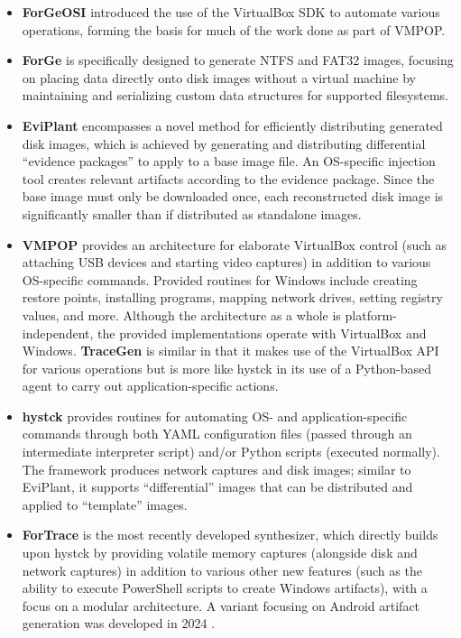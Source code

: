 \documentclass[letterpaper,12pt]{report}
\def\tightlist{}
\begin{document}
\begin{itemize}
\tightlist
\item
  \textbf{ForGeOSI} \cite{maxfraggMaxfraggForGeOSI2023} introduced
  the use of the VirtualBox SDK to automate various operations, forming
  the basis for much of the work done as part of VMPOP.
\item
  \textbf{ForGe} \cite{vistiAutomaticCreationComputer2015} is
  specifically designed to generate NTFS and FAT32 images, focusing on
  placing data directly onto disk images without a virtual machine by
  maintaining and serializing custom data structures for supported
  filesystems.
\item
  \textbf{EviPlant} \cite{scanlonEviPlantEfficientDigital2017}
  encompasses a novel method for efficiently distributing generated disk
  images, which is achieved by generating and distributing differential
  ``evidence packages'' to apply to a base image file. An OS-specific
  injection tool creates relevant artifacts according to the evidence
  package. Since the base image must only be downloaded once, each
  reconstructed disk image is significantly smaller than if distributed
  as standalone images.
\item
  \textbf{VMPOP} \cite{parkTREDEVMPOPCultivating2018} provides an
  architecture for elaborate VirtualBox control (such as attaching USB
  devices and starting video captures) in addition to various
  OS-specific commands. Provided routines for Windows include creating
  restore points, installing programs, mapping network drives, setting
  registry values, and more. Although the architecture as a whole is
  platform-independent, the provided implementations operate with
  VirtualBox and Windows. \textbf{TraceGen}
  \cite{duTraceGenUserActivity2021} is similar in that it makes use
  of the VirtualBox API for various operations but is more like hystck
  in its use of a Python-based agent to carry out application-specific
  actions.
\item
  \textbf{hystck} \cite{gobelNovelApproachGenerating2020} provides
  routines for automating OS- and application-specific commands through
  both YAML configuration files (passed through an intermediate
  interpreter script) and/or Python scripts (executed normally). The
  framework produces network captures and disk images; similar to
  EviPlant, it supports ``differential'' images that can be distributed
  and applied to ``template'' images.
\item
  \textbf{ForTrace} \cite{gobelForTraceHolisticForensic2022} is the
  most recently developed synthesizer, which directly builds upon hystck
  by providing volatile memory captures (alongside disk and network
  captures) in addition to various other new features (such as the
  ability to execute PowerShell scripts to create Windows artifacts),
  with a focus on a modular architecture. A variant focusing on Android
  artifact generation was developed in 2024
  \cite{demmelDataSynthesisGoing2024}.
\end{itemize}
\end{document}
